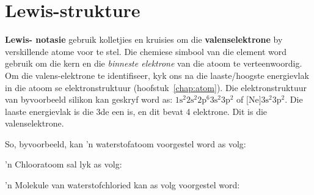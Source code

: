          \section{Lewis-strukture}
    \nopagebreak

\textbf{Lewis- notasie} gebruik kolletjies en kruisies om die \textbf{valenselektrone} by verskillende atome voor te stel. Die chemiese simbool van die element word gebruik om die kern en die \textsl{binneste elektrone} van die atoom te verteenwoordig. Om die valens-elektrone te identifiseer, kyk ons na die laaste/hoogste energievlak in die atoom se elektronstruktuur (hoofstuk~\ref{chap:atom}). Die elektronstruktuur van byvoorbeeld silikon kan geskryf word as: $1\text{s}^{2}2\text{s}^{2}2\text{p}^{6}3\text{s}^{2}3\text{p}^{2}$ of $\text{[Ne]}3\text{s}^{2}3\text{p}^{2}$. Die laaste energievlak is die 3de een is, en dit bevat 4 elektrone. Dit is die valenselektrone.
 \par 
So, byvoorbeeld, kan  'n waterstofatoom voorgestel word as volg:  

 'n Chlooratoom sal lyk as volg: 

 'n Molekule van waterstofchloried kan as volg voorgestel word:
\begin{center}
\end{center}

